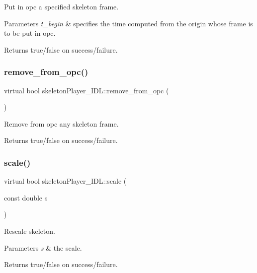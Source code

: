 Put in opc a specified skeleton frame. 


\begin{DoxyParams}{Parameters}
{\em t\+\_\+begin} & specifies the time computed from the origin whose frame is to be put in opc. \\
\hline
\end{DoxyParams}
\begin{DoxyReturn}{Returns}
true/false on success/failure. 
\end{DoxyReturn}
\mbox{\label{classskeletonPlayer__IDL_a5a8cedc7e51fc4129d1dadef1a7fec64}} 
\subsubsection{\texorpdfstring{remove\_from\_opc()}{remove\_from\_opc()}}
{\footnotesize\ttfamily virtual bool skeleton\+Player\+\_\+\+I\+D\+L\+::remove\+\_\+from\+\_\+opc (\begin{DoxyParamCaption}{ }\end{DoxyParamCaption})\hspace{0.3cm}{\ttfamily [virtual]}}



Remove from opc any skeleton frame. 

\begin{DoxyReturn}{Returns}
true/false on success/failure. 
\end{DoxyReturn}
\mbox{\label{classskeletonPlayer__IDL_ac70d533dc6ed1e642e0e03e639b6658c}} 
\subsubsection{\texorpdfstring{scale()}{scale()}}
{\footnotesize\ttfamily virtual bool skeleton\+Player\+\_\+\+I\+D\+L\+::scale (\begin{DoxyParamCaption}\item[{const double}]{s }\end{DoxyParamCaption})\hspace{0.3cm}{\ttfamily [virtual]}}



Rescale skeleton. 


\begin{DoxyParams}{Parameters}
{\em s} & the scale. \\
\hline
\end{DoxyParams}
\begin{DoxyReturn}{Returns}
true/false on success/failure. 
\end{DoxyReturn}
\mbox{\label{classskeletonPlayer__IDL_aceb3db0756cc78fd54088bfb2a8b9c39}} 
